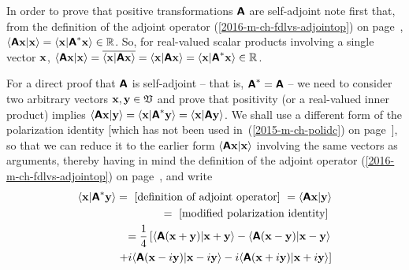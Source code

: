{\color{OliveGreen}\bproof

In order to prove that positive transformations $\textsf{\textbf{A}}$ are self-adjoint note first that,
from the definition of the adjoint operator (\ref{2016-m-ch-fdlvs-adjointop})
on page~\pageref{2016-m-ch-fdlvs-adjointop},
$
\langle \textsf{\textbf{A}} {\bf x}\vert {\bf x}\rangle
=
\langle {\bf x}\vert \textsf{\textbf{A}}^\ast {\bf x}\rangle \in \mathbb{R}$.
So, for real-valued scalar products involving a single vector ${\bf x}$,
$
\langle \textsf{\textbf{A}} {\bf x}\vert {\bf x}\rangle
= \overline{\langle {\bf x}\vert \textsf{\textbf{A}}{\bf x}\rangle }
=
\langle {\bf x}\vert \textsf{\textbf{A}}{\bf x}\rangle
=
\langle {\bf x}\vert \textsf{\textbf{A}}^\ast {\bf x}\rangle
\in \mathbb{R}
$.




For a direct proof that $\textsf{\textbf{A}}$ is self-adjoint
--
that is,   $\textsf{\textbf{A}}^\ast = \textsf{\textbf{A}}$
--
we need to
consider two arbitrary vectors ${\bf x}, {\bf y} \in {\frak V}$
and prove that positivity (or a real-valued inner product)
implies
$\langle \textsf{\textbf{A}}{\bf x}\vert {\bf y}\rangle
= \langle {\bf x}\vert \textsf{\textbf{A}}^\ast {\bf y}\rangle
= \langle {\bf x}\vert \textsf{\textbf{A}}{\bf y}\rangle  $.
We shall use a different form of the polarization identity
[which has not been used in~(\ref{2015-m-ch-polidc}) on page~\pageref{2015-m-ch-polidc2}],
so that we can reduce it to the earlier form $\langle \textsf{\textbf{A}} {\bf x}\vert {\bf x}\rangle$
involving the same vectors as arguments,
thereby having in mind
the definition of the adjoint operator (\ref{2016-m-ch-fdlvs-adjointop})
on page~\pageref{2016-m-ch-fdlvs-adjointop},
and write
\begin{equation}
\begin{split}
\langle {\bf x}\vert \textsf{\textbf{A}}^\ast {\bf y}\rangle
= \text{ [definition of adjoint operator] } =
\langle \textsf{\textbf{A}} {\bf x}\vert {\bf y}\rangle \\
=  \text{ [modified polarization identity] } \\
=
\frac{1}{4}\left[
\langle \textsf{\textbf{A}} ({\bf x}+ {\bf y}) \vert {\bf x}+ {\bf y}\rangle
-
\langle \textsf{\textbf{A}}({\bf x}- {\bf y}) \vert {\bf x}- {\bf y}\rangle \right.  \\
\left.
+ i
\langle \textsf{\textbf{A}} ({\bf x}- i{\bf y}) \vert {\bf x}- i{\bf y}\rangle
- i
\langle \textsf{\textbf{A}} ({\bf x}+ i{\bf y}) \vert {\bf x} +i {\bf y}\rangle
\right]
\\

\end{split}
\end{equation}}
